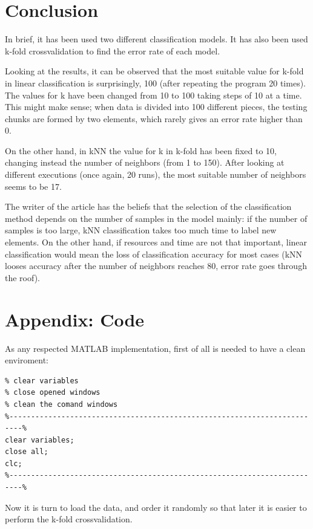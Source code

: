\documentclass[11pt]{article}
\begin{document}
\section{Conclusion}

In brief, it has been used two different classification models. It has also been
used k-fold crossvalidation to find the error rate of each model.

Looking at the results, it can be observed that the most suitable value for
k-fold in linear classification is surprisingly, 100 (after repeating the
program 20 times). The values for k have been changed from 10 to 100 taking 
steps of 10 at a time. This might make sense; when data is divided into 100 
different pieces, the testing chunks are formed by two elements, which rarely 
gives an error rate higher than 0.

On the other hand, in kNN the value for k in k-fold has been fixed to 10,
changing instead the number of neighbors (from 1 to 150). After looking at 
different executions (once again, 20 runs), the most suitable number of 
neighbors seems to be 17.

The writer of the article has the beliefs that the selection of the
classification method depends on the number of samples in the model mainly: if
the number of samples is too large, kNN classification takes too much time to
label new elements. On the other hand, if resources and time are not that
important, linear classification would mean the loss of classification accuracy
for most cases (kNN looses accuracy after the number of neighbors reaches 80,
error rate goes through the roof).

\newpage

\section*{Appendix: Code}

As any respected MATLAB implementation, first of all is needed to have a clean
enviroment:

\begin{verbatim}
% clear variables
% close opened windows
% clean the comand windows
%-------------------------------------------------------------------------%
clear variables;
close all;
clc;
%-------------------------------------------------------------------------%
\end{verbatim}

Now it is turn to load the data, and order it randomly so that later it is
easier to perform the k-fold crossvalidation.
\end{document}
